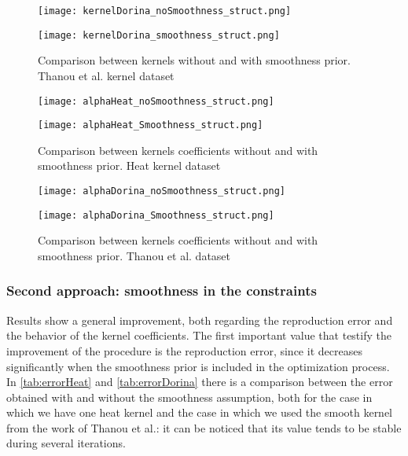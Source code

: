 \begin{figure}
  \begin{minipage}[c]{.5\textwidth}
    \centering
    \texttt{[image: kernelDorina\_noSmoothness\_struct.png]}
  \end{minipage}
  \begin{minipage}[c]{.5\textwidth}
    \centering
    \texttt{[image: kernelDorina\_smoothness\_struct.png]}
  \end{minipage}
  \caption{Comparison between kernels without and with smoothness prior. Thanou et al. kernel dataset}
  \label{fig:kernelDorina_struct}
\end{figure}

\begin{figure}
  \centering
  \begin{minipage}[c]{.8\textwidth}
    \centering
    \texttt{[image: alphaHeat\_noSmoothness\_struct.png]}
  \end{minipage}
  \begin{minipage}[c]{.8\textwidth}
    \centering
    \texttt{[image: alphaHeat\_Smoothness\_struct.png]}
  \end{minipage}
  \caption{Comparison between kernels coefficients without and with smoothness prior. Heat kernel   dataset}
  \label{fig:alphaHeat_struct}
\end{figure}

\begin{figure}
  \centering
  \begin{minipage}[c]{.8\textwidth}
    \centering
    \texttt{[image: alphaDorina\_noSmoothness\_struct.png]}
  \end{minipage}
  \begin{minipage}[c]{.8\textwidth}
    \centering
    \texttt{[image: alphaDorina\_Smoothness\_struct.png]}
  \end{minipage}
  \caption{Comparison between kernels coefficients without and with smoothness prior. Thanou et al.   dataset}
  \label{fig:alphaHeat_struct}
\end{figure}

\subsubsection{Second approach: smoothness in the constraints}
Results show a general improvement, both regarding the reproduction error and the behavior of the kernel coefficients.  The first important value that testify the improvement of the procedure is the reproduction error, since it decreases significantly when the smoothness prior is included in the optimization process. In \autoref{tab:errorHeat} and \autoref{tab:errorDorina} there is a comparison between the error obtained with and without the smoothness assumption, both for the case in which we have one heat kernel and the case in which we used the smooth kernel from the work of Thanou et al.: it can be noticed that its value tends to be stable during several iterations.

